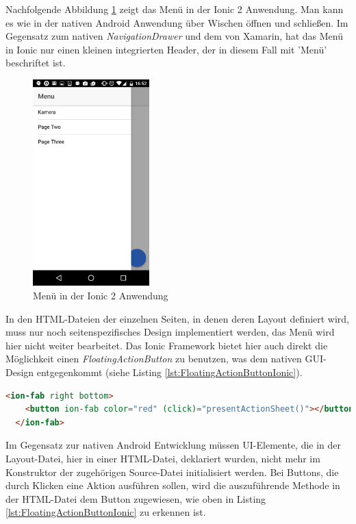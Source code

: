 Nachfolgende Abbildung \ref{fig:MenuIonic} zeigt das Menü in der Ionic 2 Anwendung. Man kann es wie in der nativen Android Anwendung über Wischen öffnen und schließen. Im Gegensatz zum nativen \textit{NavigationDrawer} und dem von Xamarin, hat das Menü in Ionic nur einen kleinen integrierten Header, der in diesem Fall mit 'Menü' beschriftet ist. 

\begin{figure}[h]
	\centering
	\includegraphics[width=0.4\textwidth]{Bilder/Screenshot_20170328-165235.PNG}
	\caption{Menü in der Ionic 2 Anwendung}
	\label{fig:MenuIonic}
\end{figure} 

In den HTML-Dateien der einzelnen Seiten, in denen deren Layout definiert wird, muss nur noch seitenspezifisches Design implementiert werden, das Menü wird hier nicht weiter bearbeitet. Das Ionic Framework bietet hier auch direkt die Möglichkeit einen \textit{FloatingActionButton} zu benutzen, was dem nativen GUI-Design entgegenkommt (siehe Listing \ref{lst:FloatingActionButtonIonic}).

\begin{lstlisting}[caption=Deklaration eines \textit{FloatingActionButton}, label=lst:FloatingActionButtonIonic, language=html]
<ion-fab right bottom>
    <button ion-fab color="red" (click)="presentActionSheet()"></button>
  </ion-fab>
\end{lstlisting}

Im Gegensatz zur nativen Android Entwicklung müssen UI-Elemente, die in der Layout-Datei, hier in einer HTML-Datei, deklariert wurden, nicht mehr im Konstruktor der zugehörigen Source-Datei initialisiert werden. Bei Buttons, die durch Klicken eine Aktion ausführen sollen, wird die auszuführende Methode in der HTML-Datei dem Button zugewiesen, wie oben in Listing \ref{lst:FloatingActionButtonIonic} zu erkennen ist. 

